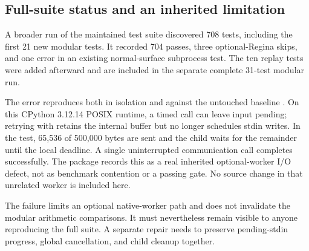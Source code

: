 \subsection{Full-suite status and an inherited limitation}

A broader run of the maintained test suite discovered 708 tests, including
the first 21 new modular tests. It recorded 704 passes, three optional-Regina
skips, and one error in an existing normal-surface subprocess test. The ten
replay tests were added afterward and are included in the separate complete
31-test modular run.

The error reproduces both in isolation and against the untouched baseline
. On this CPython 3.12.14 POSIX runtime, a timed
 call can leave input pending; retrying with
 retains the internal buffer but no longer schedules
stdin writes. In the test, 65,536 of 500,000 bytes are sent and the child waits
for the remainder until the local deadline. A single uninterrupted communication
call completes successfully. The package records this as a real inherited
optional-worker I/O defect, not as benchmark contention or a passing gate.
No source change in that unrelated worker is included here.

The failure limits an optional native-worker path and does not invalidate the
modular arithmetic comparisons. It must nevertheless remain visible to anyone
reproducing the full suite. A separate repair needs to preserve pending-stdin
progress, global cancellation, and child cleanup together.
